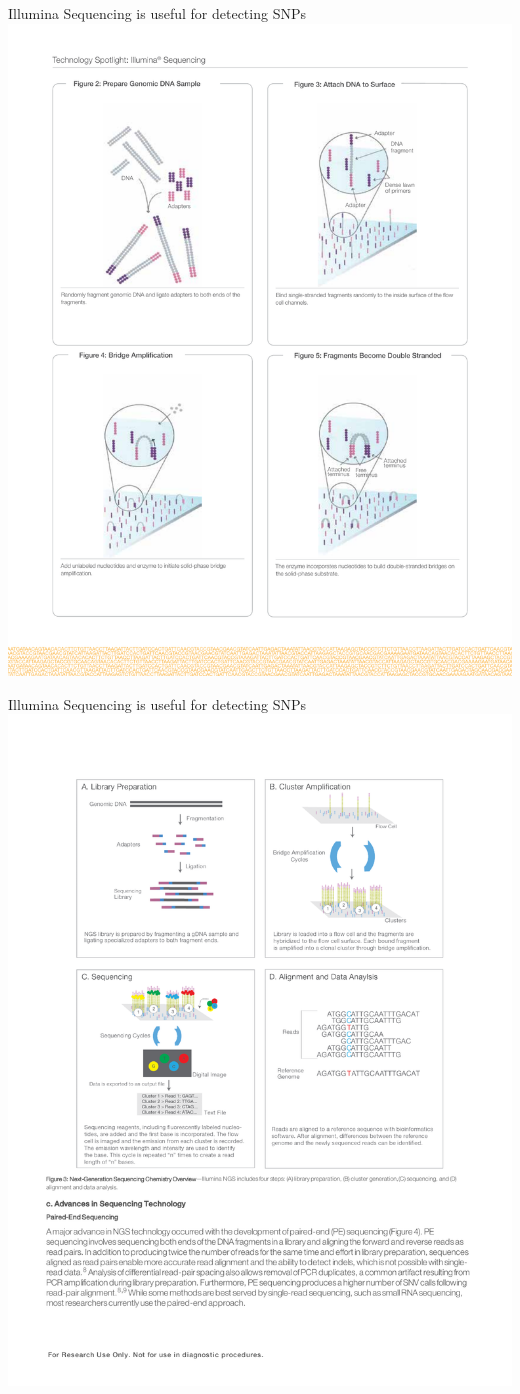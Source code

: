 \documentclass{beamer}
\begin{document}

\begin{frame}{Illumina Sequencing is useful for detecting SNPs}
\includegraphics[width=\linewidth,trim={.5in 2.5cm .5in 14cm},clip]{illumina_techspotlight_p2.pdf}
\end{frame}

\begin{frame}{Illumina Sequencing is useful for detecting SNPs}
\centering
\includegraphics[width=.5\linewidth,trim={1in 9cm 4.2in 4in},clip]{illumina_intro_p5.pdf}
\end{frame}
\end{document}
